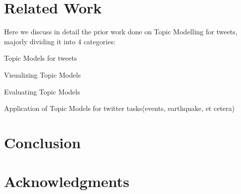 \documentclass[10pt,a5paper,twoside]{article}
\begin{document}
\section{Related Work}
Here we discuss in detail the prior work done on Topic Modelling for tweets, majorly dividing it into 4 categories:
\begin{compactenum}
\item Topic Models for tweets
\item Visualizing Topic Models
\item Evaluating Topic Models
\item Application of Topic Models for twitter tasks(events, earthquake, et cetera)\\
\end{compactenum}

\section{Conclusion}
\section*{Acknowledgments}

%





\nocite{TALN2007,LaigneletRioult09,LanglaisPatry07,au1972,cks1981,mb2012}

\end{document}
